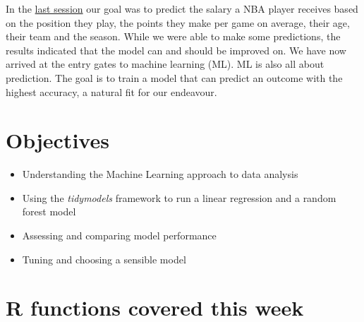 \documentclass[
]{book}
\providecommand{\tightlist}{%
  \setlength{\itemsep}{0pt}\setlength{\parskip}{0pt}}
\begin{document}
In the \protect\hyperlink{pm-t}{last session} our goal was to predict the salary a NBA player
receives based on the position they play, the points they make per game on
average, their age, their team and the season. While we were able to make some
predictions, the results indicated that the model can and should be improved on.
We have now arrived at the entry gates to machine learning (ML). ML is also all
about prediction. The goal is to train a model that can predict an outcome with
the highest accuracy, a natural fit for our endeavour.

\hypertarget{objectives-7}{%
\section{Objectives}\label{objectives-7}}

\begin{itemize}
\tightlist
\item
  Understanding the Machine Learning approach to data analysis
\item
  Using the \emph{tidymodels} framework to run a linear regression and a random forest model
\item
  Assessing and comparing model performance
\item
  Tuning and choosing a sensible model
\end{itemize}

\hypertarget{r-functions-covered-this-week-3}{%
\section{R functions covered this week}\label{r-functions-covered-this-week-3}}
\end{document}
